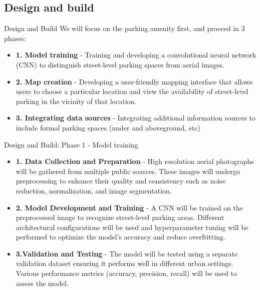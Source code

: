 \documentclass{beamer}
\begin{document}
\subsection{Design and build}
\begin{frame}{Design and Build} We will focus on the parking amenity first, and proceed in 3 phases:
    \begin{itemize}
        \item{\textbf{1. Model training} - }Training and developing a convolutional neural network (CNN) to distinguish street-level parking spaces from aerial images.
        \item{\textbf{2. Map creation} - } Developing a user-friendly mapping interface that allows users to choose a particular location and view the availability of street-level parking in the vicinity of that location.
        \item{\textbf{3. Integrating data sources} - } Integrating additional information sources to include formal parking spaces (under and aboveground, etc)
    \end{itemize}
\end{frame}

\begin{frame}{Design and Build: Phase 1 - Model training}
    \begin{itemize}
        \item{\textbf{1. Data Collection and Preparation} - } High resolution aerial photographs will be gathered from multiple public sources. These images will undergo preprocessing to enhance their quality and consistency such as noise reduction, normalization, and image segmentation.
        \item{\textbf{2. Model Development and Training} - } A CNN will be trained on the preprocessed image to recognize street-level parking areas. Different architectural configurations will be used and hyperparameter tuning will be performed to optimize the model's accuracy and reduce overftitting.
        \item{\textbf{3.Validation and Testing} - } The model will be tested using a separate validation dataset ensuring it performs well in different urban settings. Various performance metrics (accuracy, precision, recall) will be used to assess the model.
    \end{itemize}
\end{frame}
\end{document}
